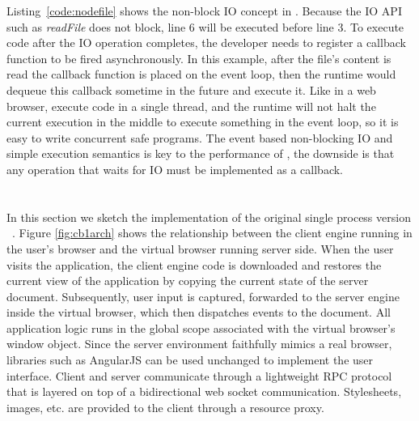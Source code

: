 
Listing~\ref{code:nodefile} shows the non-block IO concept in \nodejs.
Because the IO API such as \emph{readFile} does not
block, line 6 will be executed before line 3.
To execute code after the IO operation completes,
the developer needs to register a callback function to be fired asynchronously.
In this example, after the file's content is read the callback function is placed on the
event loop,
then the runtime would dequeue this callback sometime in the future and execute it.
Like in a web browser, \nodejs execute \js code in a single thread,
and the runtime will not halt the current execution in the middle to execute something in
the event loop, so it is easy to write concurrent safe programs.
The event based non-blocking IO and simple execution semantics 
is key to the performance of \nodejs, 
the downside is that any operation that waits for IO must be implemented as a callback.



\section{\cb}

\architectureoverview{}

In this section we sketch the implementation of 
the original single process version \cb{}~\cite{mcdaniel2012cloudbrowser}.
Figure \ref{fig:cb1arch} shows the relationship 
between the client engine running in the user's browser and the virtual browser
running server side.  When the user visits the application, the client engine
code is downloaded and restores the current view of the application by
copying the current state of the server document.  Subsequently, user input 
is captured, forwarded to the server engine inside the virtual browser, 
which then dispatches events to the document.  All application logic runs
in the global scope associated with the virtual browser's window object.
Since the server environment faithfully mimics a real browser, libraries
such as AngularJS can be used unchanged to implement the user interface.
Client and server communicate through a lightweight RPC protocol that is 
layered on top of a bidirectional web socket communication. 
Stylesheets, images, etc. are provided to the client through a resource
proxy.
